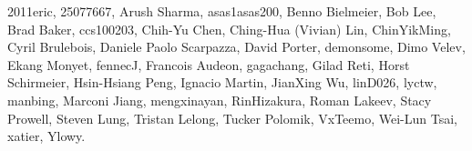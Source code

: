 2011eric,                      %
25077667,                      %
Arush Sharma,                  %
asas1asas200,                  %
Benno Bielmeier,               %
Bob Lee,                       %
Brad Baker,                    %
ccs100203,                     %
Chih-Yu Chen,                  %
Ching-Hua (Vivian) Lin,        %
ChinYikMing,                   %
Cyril Brulebois,               %
Daniele Paolo Scarpazza,       %
David Porter,                  %
demonsome,                     %
Dimo Velev,                    %
Ekang Monyet,                  %
fennecJ,                       %
Francois Audeon,               %
gagachang,                     %
Gilad Reti,                    %
Horst Schirmeier,              %
Hsin-Hsiang Peng,              %
Ignacio Martin,                %
JianXing Wu,                   %
linD026,                       %
lyctw,                         %
manbing,                       %
Marconi Jiang,                 %
mengxinayan,                   %
RinHizakura,                   %
Roman Lakeev,                  %
Stacy Prowell,                 %
Steven Lung,                   %
Tristan Lelong,                %
Tucker Polomik,                %
VxTeemo,                       %
Wei-Lun Tsai,                  %
xatier,                        %
Ylowy.                         %
